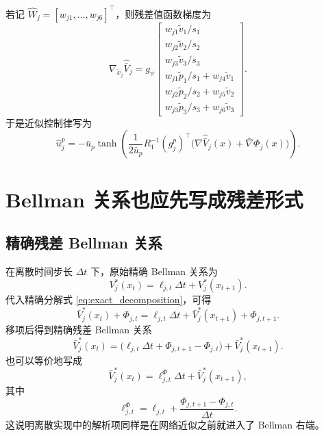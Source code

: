 \documentclass[11pt,a4paper]{article}
\newcommand{\ubar}{\bar{u}}
\begin{document}
若记 $\hat W_j=[w_{j1},\dots,w_{j6}]^\top$，则残差值函数梯度为
\begin{equation}
\nabla_{\tilde x_j}\hat{\bar V}_j
=
g_\psi
\begin{bmatrix}
w_{j1}\tilde v_1/s_1\\
w_{j2}\tilde v_2/s_2\\
w_{j3}\tilde v_3/s_3\\
w_{j1}\tilde p_1/s_1+w_{j4}\tilde v_1\\
w_{j2}\tilde p_2/s_2+w_{j5}\tilde v_2\\
w_{j3}\tilde p_3/s_3+w_{j6}\tilde v_3
\end{bmatrix}.
\label{eq:residual_grad}
\end{equation}
于是近似控制律写为
\begin{equation}
\hat u_j^p
=
-\ubar_p
\tanh\!\left(
\frac{1}{2\ubar_p}
R_1^{-1}
(g_j^p)^\top
\big(
\nabla\hat{\bar V}_j(x)+\bar\nabla\Phi_j(x)
\big)
\right).
\label{eq:pursuer_ctrl_approx}
\end{equation}

\section{Bellman 关系也应先写成残差形式}

\subsection{精确残差 Bellman 关系}

在离散时间步长 $\Delta t$ 下，原始精确 Bellman 关系为
\begin{equation}
V_j^*(x_t)=\ell_{j,t}\Delta t+V_j^*(x_{t+1}).
\label{eq:bellman_original}
\end{equation}
代入精确分解式 \eqref{eq:exact_decomposition}，可得
\begin{equation}
\bar V_j^*(x_t)+\Phi_{j,t}
=
\ell_{j,t}\Delta t+\bar V_j^*(x_{t+1})+\Phi_{j,t+1}.
\end{equation}
移项后得到精确残差 Bellman 关系
\begin{equation}
\bar V_j^*(x_t)
=
\Big(
\ell_{j,t}\Delta t+\Phi_{j,t+1}-\Phi_{j,t}
\Big)
+
\bar V_j^*(x_{t+1}).
\label{eq:bellman_residual_exact}
\end{equation}
也可以等价地写成
\begin{equation}
\bar V_j^*(x_t)=\ell_{j,t}^{\Phi}\Delta t+\bar V_j^*(x_{t+1}),
\end{equation}
其中
\begin{equation}
\ell_{j,t}^{\Phi}
=
\ell_{j,t}
+
\frac{\Phi_{j,t+1}-\Phi_{j,t}}{\Delta t}.
\label{eq:discrete_shaped_cost}
\end{equation}
这说明离散实现中的解析项同样是在网络近似之前就进入了 Bellman 右端。
\end{document}
